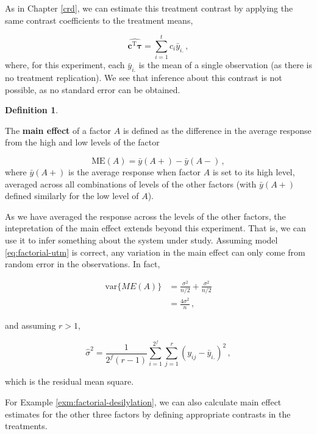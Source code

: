 \documentclass[
]{book}
\theoremstyle{definition}
\newtheorem{definition}{Definition}[chapter]
\theoremstyle{definition}
\theoremstyle{definition}
\theoremstyle{definition}
\theoremstyle{remark}
\begin{document}
As in Chapter \ref{crd}, we can estimate this treatment contrast by applying the same contrast coefficients to the treatment means,

\[
\widehat{\boldsymbol{c}^{\mathrm{T}}\boldsymbol{\tau}} = \sum_{i=1}^tc_i\bar{y}_{i.}\,,
\]
where, for this experiment, each \(\bar{y}_{i.}\) is the mean of a single observation (as there is no treatment replication). We see that inference about this contrast is not possible, as no standard error can be obtained.

\begin{definition}
\protect\hypertarget{def:main-effect}{}\label{def:main-effect}

The \textbf{main effect} of a factor \(A\) is defined as the difference in the average response from the high and low levels of the factor

\[
\mbox{ME}(A) = \bar{y}(A+) - \bar{y}(A-)\,,
\]
where \(\bar{y}(A+)\) is the average response when factor \(A\) is set to its high level, averaged across all combinations of levels of the other factors (with \(\bar{y}(A+)\) defined similarly for the low level of \(A\)).

\end{definition}

As we have averaged the response across the levels of the other factors, the intepretation of the main effect extends beyond this experiment. That is, we can use it to infer something about the system under study. Assuming model \eqref{eq:factorial-utm} is correct, any variation in the main effect can only come from random error in the observations. In fact,

\begin{align*}
\mbox{var}\{ME(A)\} & = \frac{\sigma^2}{n/2} + \frac{\sigma^2}{n/2} \\
& = \frac{4\sigma^2}{n}\,,
\end{align*}

and assuming \(r>1\),

\begin{equation}
\hat{\sigma}^2 = \frac{1}{2^f(r-1)} \sum_{i=1}^{2^f}\sum_{j=1}^r(y_{ij} - \bar{y}_{i.})^2\,,
\label{eq:factorial-sigma-hat-2}
\end{equation}

which is the residual mean square.

For Example \ref{exm:factorial-desilylation}, we can also calculate main effect estimates for the other three factors by defining appropriate contrasts in the treatments.
\end{document}
